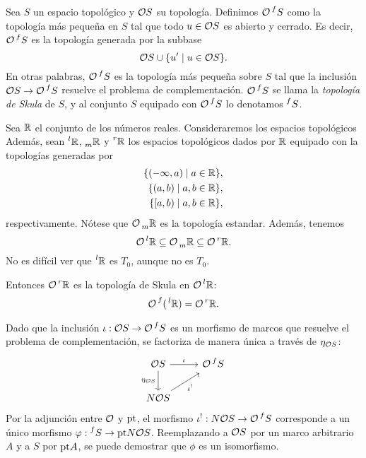 \begin{defn}
    Sea $S$ un espacio topológico y $\cal OS$ su topología.
    Definimos $\cal O\prs f{}S$ como la topología más pequeña
    en $S$ tal que todo $u\in\cal OS$ es abierto y cerrado.
    Es decir, $\cal O\prs f{}S$ es la topología generada por la subbase
    \[
        \cal OS\cup\{u'\mid u\in\cal OS\}
    .\]
    En otras palabras, $\cal O\prs f{}S$
    es la topología más pequeña sobre $S$
    tal que la inclusión $\cal OS\to\cal O\prs f{}S$ resuelve
    el problema de complementación.
    $\cal O\prs f{}S$ se llama la \emph{topología de Skula}
    de $S$, y al conjunto $S$ equipado con $\cal O\prs f{}S$
    lo denotamos $\prs f{}S$.
\end{defn}

\begin{exa}
    Sea $\R$ el conjunto de los números reales.
    Consideraremos los espacios topológicos
    Además, sean $\prs l{}\R$, $\prs{}m\R$
    y $\prs r{}\R$ los espacios topológicos dados por $\R$
    equipado con la topologías generadas por
    \begin{align*}
        \{(-\infty,a)\mid a\in\R\}, \\
        \{(a,b)\mid a,b\in\R\}, \\
        \{[a,b)\mid a,b\in\R\},
    \end{align*}
    respectivamente.
    Nótese que $\cal O\prs{}m\R$ es la topología estandar.
    Además, tenemos
    \[
        \cal O\prs l{}\R
        \subseteq
        \cal O\prs{}m\R
        \subseteq
        \cal O\prs r{}\R.
    \]
    No es difícil ver que $\prs l{}\R$ es $T_0$,
    aunque no es $T_0$.
    
    Entonces $\cal O\prs r{}\R$ es la topología de Skula
    en $\cal O\prs l{}\R$:
    \[
        \cal O\prs f{}(\prs l{}\R)
        = \cal O\prs r{}\R
    .\]
\end{exa}

Dado que la inclusión $\iota:\cal OS\to\cal O\prs f{}S$
es un morfismo de marcos que resuelve el problema de complementación,
se factoriza de manera única a través de $\eta_{\cal OS}$:
\[
    \begin{tikzcd}
        \cal OS \ar[d,"\eta_{\cal OS}"'] \ar[r,"\iota"]
        & \cal O\prs f{}S \\
        N\cal OS \ar[ur,"\iota^!"']
    \end{tikzcd}
\]
Por la adjunción entre $\cal O$ y $\pt$,
el morfismo $\iota^!:N\cal OS\to\cal O\prs f{}S$ corresponde
a un único morfismo $\phi:\prs f{}S\to\pt N\cal OS$.
Reemplazando a $\cal OS$ por un marco arbitrario $A$
y a $S$ por $\pt A$,
se puede demostrar que $\phi$ es un isomorfismo.

